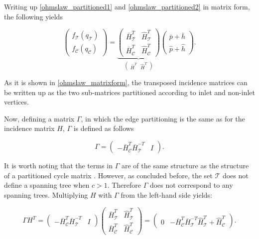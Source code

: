 Writing up \eqref{ohmslaw_partitioned1} and \eqref{ohmslaw_partitioned2} in matrix form, the following yields

\begin{equation}
\label{ohmslaw_matrixform}
 \begin{pmatrix} 
 f_{\mathcal{T}}(q_\mathcal{T}) \\[3pt]
 f_{\mathcal{C}}(q_\mathcal{C}) 
 \end{pmatrix}
 =
  \underbrace{\begin{pmatrix}
   \bar{H}^T_{\mathcal{T}} & \hat{H}^T_{\mathcal{T}} \\[3pt]
   \bar{H}^T_{\mathcal{C}} & \hat{H}^T_{\mathcal{C}} 
   \end{pmatrix}}_{\begin{pmatrix} 
                  \bar{H}^T & \hat{H}^T 
                  \end{pmatrix}}
   \begin{pmatrix} 
 \bar{p} + \bar{h} \\[3pt] 
 \hat{p} + \hat{h} 
 \end{pmatrix}.
\end{equation}

As it is shown in \eqref{ohmslaw_matrixform}, the transposed incidence matrices can be written up as the two sub-matrices partitioned according to inlet and non-inlet vertices. 

Now, defining a matrix $\Gamma$, in which the edge partitioning is the same as for the incidence matrix $H$, $\Gamma$ is defined as follows

\begin{equation}
\label{bmatrix}
\Gamma
 =
\begin{pmatrix} 
-\bar{H}^T_{\mathcal{C}}\bar{H}^{-T}_{\mathcal{T}} & I 
\end{pmatrix}.
\end{equation}

It is worth noting that the terms in $\Gamma$ are of the same structure as the structure of a partitioned cycle matrix \cite{deo2017graph}. However, as concluded before, the set $\mathcal{T}$ does not define a spanning tree when $c>1$. Therefore $\Gamma$ does not correspond to any spanning trees. Multiplying $H$ with $\Gamma$ from the left-hand side yields:

 \begin{equation}
  \label{meshlaw_analogy}
  \Gamma H^T = 
  \begin{pmatrix} 
-\bar{H}^T_{\mathcal{C}}\bar{H}^{-T}_{\mathcal{T}} & I 
\end{pmatrix}
\begin{pmatrix}
   \bar{H}^T_{\mathcal{T}} & \hat{H}^T_{\mathcal{T}} \\[3pt]
   \bar{H}^T_{\mathcal{C}} & \hat{H}^T_{\mathcal{C}} 
   \end{pmatrix} 
   =
   \begin{pmatrix} 
0 & -\bar{H}^T_{\mathcal{C}}\bar{H}^{-T}_{\mathcal{T}}\hat{H}^T_{\mathcal{T}} + \hat{H}^T_{\mathcal{C}} 
\end{pmatrix}
.
\end{equation}


